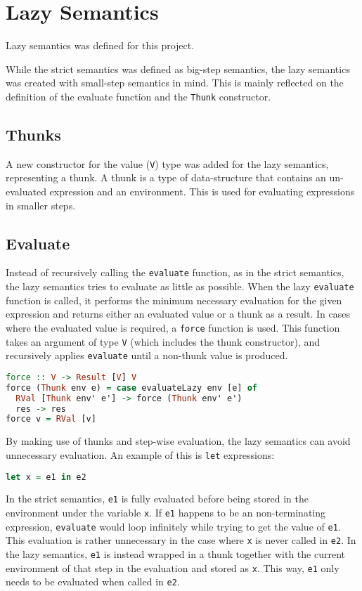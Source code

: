 \section{Lazy Semantics}
\label{LazySem}
Lazy semantics was defined for this project.

While the strict semantics was defined as big-step semantics, the lazy semantics
was created with small-step semantics in mind. This is mainly reflected on the
definition of the evaluate function and the \texttt{Thunk} constructor.

\subsection{Thunks}
A new constructor for the value (\texttt{V}) type was added for the lazy semantics, representing
a thunk. A thunk is a type of data-structure that contains an un-evaluated expression
and an environment\cite{Takano:2015:TRL:2695664.2695693}. This is used for evaluating
expressions in smaller steps.

\subsection{Evaluate}
\label{Eval}
Instead of recursively calling the \texttt{evaluate} function, as
in the strict semantics, the lazy semantics tries to evaluate as little as possible.
When the lazy \texttt{evaluate} function is called, it performs the minimum necessary evaluation
for the given expression and returns either an evaluated value or a thunk as a result.
In cases where the evaluated value is required, a \texttt{force} function is used.
This function takes an argument of type \texttt{V} (which includes the thunk constructor),
and recursively applies \texttt{evaluate} until a non-thunk value is produced.

\noindent \begin{minipage}{\linewidth}
\begin{lstlisting}[caption=\texttt{force} defined in Haskell,language=haskell]
force :: V -> Result [V] V
force (Thunk env e) = case evaluateLazy env [e] of
  RVal [Thunk env' e'] -> force (Thunk env' e')
  res -> res
force v = RVal [v]
\end{lstlisting}
\end{minipage}

By making use of thunks and step-wise evaluation, the lazy semantics can avoid unnecessary
evaluation. An example of this is \texttt{let} expressions:
\begin{lstlisting}[language=haskell]
  let x = e1 in e2
\end{lstlisting}
In the strict semantics, \texttt{e1} is fully evaluated before being stored in the
environment under the variable \texttt{x}. If \texttt{e1} happens to be an non-terminating
expression, \texttt{evaluate} would loop infinitely while trying to get the value of \texttt{e1}.
This evaluation is rather unnecessary in the case where \texttt{x} is never called in
\texttt{e2}. In the lazy semantics, \texttt{e1} is instead wrapped in a thunk together with
the current environment of that step in the evaluation and stored as \texttt{x}. This way,
\texttt{e1} only needs to be evaluated when called in \texttt{e2}.
